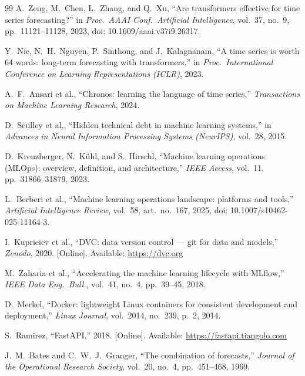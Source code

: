 \documentclass[conference]{IEEEtran}
\begin{document}
\begin{thebibliography}{99}
     A.\ Zeng, M.\ Chen, L.\ Zhang, and Q.\ Xu, ``Are
      transformers effective for time series forecasting?'' in \textit{Proc.\ AAAI
      Conf.\ Artificial Intelligence}, vol.\ 37, no.\ 9, pp.\ 11121--11128, 2023,
      doi: 10.1609/aaai.v37i9.26317.

     Y.\ Nie, N.\ H.\ Nguyen, P.\ Sinthong, and J.\ Kalagnanam,
      ``A time series is worth 64 words: long-term forecasting with transformers,''
      in \textit{Proc.\ International Conference on Learning Representations (ICLR)},
      2023.

     A.\ F.\ Ansari et al., ``Chronos: learning the
      language of time series,'' \textit{Transactions on Machine Learning
      Research}, 2024.

     D.\ Sculley et al., ``Hidden technical debt in
      machine learning systems,'' in \textit{Advances in Neural Information
      Processing Systems (NeurIPS)}, vol.\ 28, 2015.

     D.\ Kreuzberger, N.\ K\"{u}hl, and S.\ Hirschl,
      ``Machine learning operations (MLOps): overview, definition, and architecture,''
      \textit{IEEE Access}, vol.\ 11, pp.\ 31866--31879, 2023.

     L.\ Berberi et al., ``Machine learning operations
      landscape: platforms and tools,'' \textit{Artificial Intelligence Review},
      vol.\ 58, art.\ no.\ 167, 2025, doi: 10.1007/s10462-025-11164-3.

     I.\ Kuprieiev et al., ``DVC: data version control — git for
      data and models,'' \textit{Zenodo}, 2020. [Online]. Available:
      \url{https://dvc.org}

     M.\ Zaharia et al., ``Accelerating the machine learning
      lifecycle with MLflow,'' \textit{IEEE Data Eng.\ Bull.}, vol.\ 41, no.\ 4, pp.\ 39--45,
      2018.

     D.\ Merkel, ``Docker: lightweight Linux containers for
      consistent development and deployment,'' \textit{Linux Journal}, vol.\ 2014,
      no.\ 239, p.\ 2, 2014.

     S.\ Ramirez, ``FastAPI,'' 2018. [Online]. Available:
      \url{https://fastapi.tiangolo.com}

     J.\ M.\ Bates and C.\ W.\ J.\ Granger, ``The combination
      of forecasts,'' \textit{Journal of the Operational Research Society}, vol.\ 20,
      no.\ 4, pp.\ 451--468, 1969.


\end{thebibliography}
\end{document}
